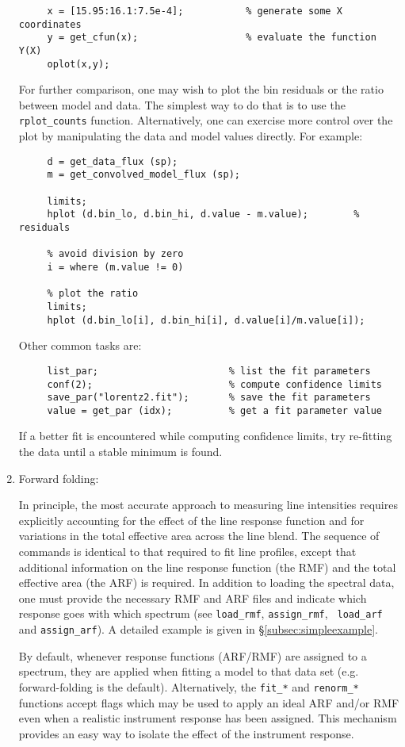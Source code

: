 \documentclass{book}
\begin{document}
\begin{enumerate}
     \begin{verbatim}
     x = [15.95:16.1:7.5e-4];           % generate some X coordinates
     y = get_cfun(x);                   % evaluate the function Y(X)
     oplot(x,y);
     \end{verbatim}

For further comparison, one may wish to plot the bin residuals or the ratio
between model and data.  The simplest way to do that is to use
the \verb|rplot_counts| function.  Alternatively,
one can exercise more control over the plot by
manipulating the data and model values directly.
For example:

     \begin{verbatim}
     d = get_data_flux (sp);
     m = get_convolved_model_flux (sp);

     limits;
     hplot (d.bin_lo, d.bin_hi, d.value - m.value);        % residuals

     % avoid division by zero
     i = where (m.value != 0)

     % plot the ratio
     limits;
     hplot (d.bin_lo[i], d.bin_hi[i], d.value[i]/m.value[i]);
     \end{verbatim}

Other common tasks are:

     \begin{verbatim}
     list_par;                       % list the fit parameters
     conf(2);                        % compute confidence limits
     save_par("lorentz2.fit");       % save the fit parameters
     value = get_par (idx);          % get a fit parameter value
     \end{verbatim}

If a better fit is encountered while computing confidence limits,
try re-fitting the data until a stable minimum is found.

\item Forward folding:

In principle, the most accurate approach to measuring line intensities
requires explicitly accounting for the effect of the line response
function and for variations in the total effective area across the
line blend. The sequence of commands is identical to that required to
fit line profiles, except that additional information on the line
response function (the RMF) and the total effective area (the ARF) is
required.  In addition to loading the spectral data, one must provide
the necessary RMF and ARF files and indicate which response goes with
which spectrum (see {\tt load\_rmf}, {\tt assign\_rmf}, {\tt
load\_arf} and {\tt assign\_arf}).  A detailed example is given in
\S\ref{subsec:simpleexample}.

By default, whenever response functions (ARF/RMF) are assigned to a
spectrum, they are applied when fitting a model to that data set (e.g.
forward-folding is the default).  Alternatively, the {\tt fit\_*} and
{\tt renorm\_*} functions accept flags which may be used to apply an
ideal ARF and/or RMF even when a realistic instrument response has
been assigned.  This mechanism provides an easy way to isolate the
effect of the instrument response.

\end{enumerate}
\end{document}

